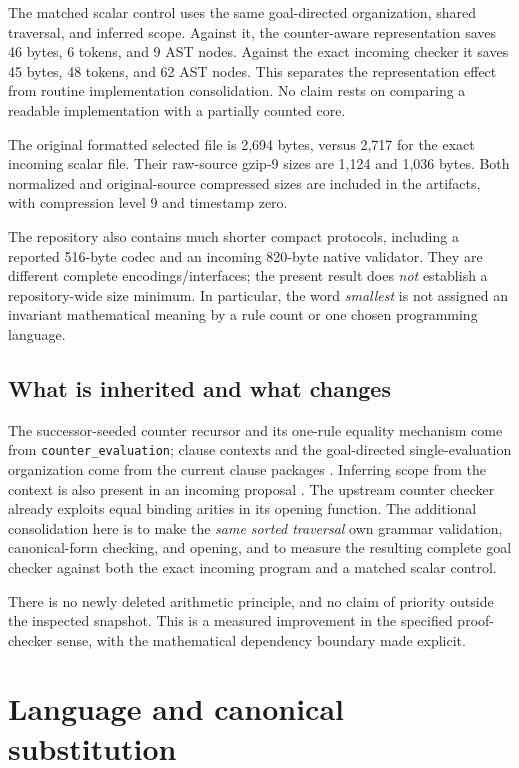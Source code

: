 \documentclass[10pt,letterpaper]{article}
\theoremstyle{definition}
\theoremstyle{remark}
\begin{document}
The matched scalar control uses the same goal-directed organization,
shared traversal, and inferred scope. Against it, the counter-aware
representation saves 46 bytes, 6 tokens, and 9 AST nodes. Against the
exact incoming checker it saves 45 bytes, 48 tokens, and 62 AST nodes.
This separates the representation effect from routine implementation
consolidation. No claim rests on comparing a readable implementation
with a partially counted core.

The original formatted selected file is 2,694 bytes, versus 2,717 for the
exact incoming scalar file. Their raw-source gzip-9 sizes are 1,124 and
1,036 bytes. Both normalized and original-source compressed sizes are
included in the artifacts, with compression level 9 and timestamp zero.

The repository also contains much shorter compact protocols, including
a reported 516-byte codec and an incoming 820-byte native validator.
They are different complete encodings/interfaces; the present result
does \emph{not} establish a repository-wide size minimum. In particular,
the word \emph{smallest} is not assigned an invariant mathematical meaning
by a rule count or one chosen programming language.

\subsection{What is inherited and what changes}

The successor-seeded counter recursor and its one-rule equality mechanism
come from \texttt{counter\_evaluation}; clause contexts and the goal-directed
single-evaluation organization come from the current clause packages
\cite{counter,single,uniformclauses}. Inferring scope from the context is
also present in an incoming proposal \cite{deterministic}. The upstream
counter checker already exploits equal binding arities in its opening
function. The additional consolidation here is to make the \emph{same
sorted traversal} own grammar validation, canonical-form checking, and
opening, and to measure the resulting complete goal checker against both
the exact incoming program and a matched scalar control.

There is no newly deleted arithmetic principle, and no claim of priority
outside the inspected snapshot. This is a measured improvement in the
specified proof-checker sense, with the mathematical dependency boundary
made explicit.

\section{Language and canonical substitution}\label{sec:syntax}
\end{document}
